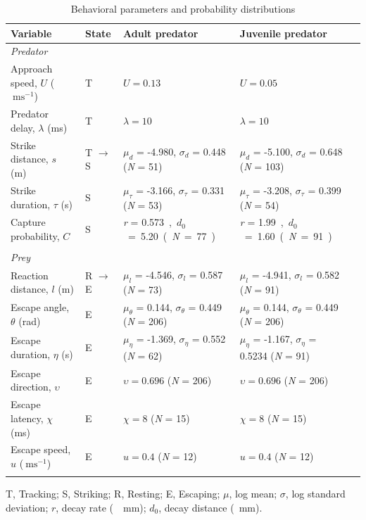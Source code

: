 \documentclass[]{rsos}%
\begin{document}
\begin{table}[!h]
\scriptsize
\caption{Behavioral parameters and probability distributions}%
\begin{tabular}{lllll}%
\hline
Variable &State &Adult predator & Juvenile predator\\
\hline
\textit{Predator}& & & & \\
Approach speed, $U$ ($\SI{}{\m\s} ^{-1}$) &T &$U = 0.13$ & $U = 0.05$ \\
Predator delay, $\lambda$ (ms) &T &$\lambda = 10$ &$\lambda = 10$ \\
Strike distance, $s$ (m) &T $\to$ S &$\mu_d$ = -4.980, $\sigma_d$ = 0.448 (\textit{N} = 51) & $\mu_d$ = -5.100, $\sigma_d$ = 0.648 (\textit{N} = 103)\\
Strike duration, $\tau$ (s) &S &$\mu_{\tau}$ = -3.166, $\sigma_{\tau}$ = 0.331 (\textit{N} = 53) & $\mu_{\tau}$ = -3.208, $\sigma_{\tau}$ = 0.399 (\textit{N} = 54) \\
Capture probability, $C$ &S &\textit{r} = \SI{0.573}, \textit{$d_0$} = \SI{5.20}  (\textit{N} = 77) &\textit{r} = \SI{1.99}, \textit{$d_0$} = \SI{1.60}  (\textit{N} = 91) \\ \\
\textit{Prey}& & & & \\
Reaction distance, $l$ (m) &R $\to$ E &$\mu_l$ = -4.546, $\sigma_l$ = 0.587 (\textit{N} = 73) &$\mu_l$ = -4.941, $\sigma_l$ = 0.582 (\textit{N} = 91) \\
Escape angle, $\theta$ (rad) &E  &$\mu_{\theta}$ = 0.144, $\sigma_{\theta}$ = 0.449 (\textit{N} = 206) &$\mu_{\theta}$ = 0.144, $\sigma_{\theta}$ = 0.449 (\textit{N} = 206) \\
Escape duration, $\eta$ (s) &E &$\mu_{\eta}$ = -1.369, $\sigma_{\eta}$ = 0.552 (\textit{N} = 62) &$\mu_{\eta}$ = -1.167, $\sigma_{\eta}$ = 0.5234 (\textit{N} = 91) \\
Escape direction, $\upsilon$ &E &$\upsilon=0.696$ (\textit{N} = 206) &$\upsilon=0.696$ (\textit{N} = 206) \\
Escape latency, $\chi$ (ms) &E &$\chi = 8$ (\textit{N} = 15) & $\chi = 8$ (\textit{N} = 15)\\
Escape speed, $u$ ($\SI{}{\m\s} ^{-1}$) &E  &$u = 0.4$ (\textit{N} = 12) &$u = 0.4$ (\textit{N} = 12) \\\hline
\label{table}
\end{tabular}

T, Tracking; S, Striking; R, Resting; E, Escaping; $\mu$, log mean; $\sigma$, log standard deviation; $r$, decay rate (\SI{}{\per\mm}); $d_0$, decay distance (\SI{}{\mm}).
\end{table}%
\end{document}
